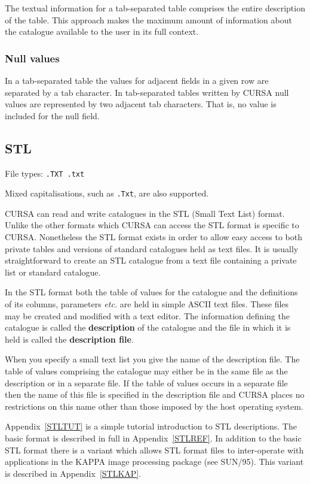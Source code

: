 \documentclass[twoside,11pt]{article}
\newcommand{\xref}[3]{#1}
\renewcommand{\_}{\texttt{\symbol{95}}}
\begin{document}
The textual information for a tab-separated table comprises the entire
description of the table.  This approach makes the maximum amount of
information about the catalogue available to the user in its full context.

\subsubsection{Null values}

In a tab-separated table the values for adjacent fields in a given row are
separated by a tab character.  In tab-separated tables written by CURSA
null values are represented by two adjacent tab characters.  That is, no
value is included for the null field.

\subsection{STL}

File types: {\tt .TXT  .txt}

Mixed capitalisations, such as {\tt .Txt}, are also supported.

CURSA can read and write catalogues in the STL (Small Text List) format.
Unlike the other formats which CURSA can access the STL format is specific
to CURSA.  Nonetheless the STL format exists in order to allow
easy access to both private tables and versions of standard catalogues
held as text files.  It is usually straightforward to create an STL
catalogue from a text file containing a private list or standard catalogue.

In the STL format both the table of values for the catalogue and the
definitions of its columns, parameters \emph{etc.} are held in simple ASCII
text files.  These files may be created and modified with a text editor.
The information defining the catalogue is called the {\bf description} of
the catalogue and the file in which it is held is called the {\bf
description file}.

When you specify a small text list you give the name of the description
file.  The table of values comprising the catalogue may either be in the
same file as the description or in a separate file.  If the table of values
occurs in a separate file then the name of this file is specified in the
description file and CURSA places no restrictions on this name other than
those imposed by the host operating system.

Appendix~\ref{STLTUT} is a simple tutorial introduction to STL
descriptions.  The basic format is described in full in
Appendix~\ref{STLREF}.  In addition to the basic STL format there is a
variant which allows STL format files to inter-operate with applications
in the KAPPA image processing package (see
\xref{SUN/95}{sun95}{}\cite{SUN95}).  This variant is described in
Appendix~\ref{STLKAP}.
\end{document}
